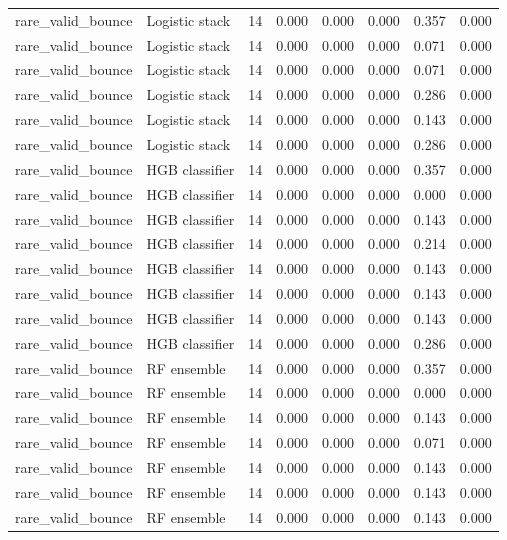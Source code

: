 {\begin{longtable}{llrrrrrr}
rare\_valid\_bounce & Logistic stack & 14 & 0.000 & 0.000 & 0.000 & 0.357 & 0.000 \\
rare\_valid\_bounce & Logistic stack & 14 & 0.000 & 0.000 & 0.000 & 0.071 & 0.000 \\
rare\_valid\_bounce & Logistic stack & 14 & 0.000 & 0.000 & 0.000 & 0.071 & 0.000 \\
rare\_valid\_bounce & Logistic stack & 14 & 0.000 & 0.000 & 0.000 & 0.286 & 0.000 \\
rare\_valid\_bounce & Logistic stack & 14 & 0.000 & 0.000 & 0.000 & 0.143 & 0.000 \\
rare\_valid\_bounce & Logistic stack & 14 & 0.000 & 0.000 & 0.000 & 0.286 & 0.000 \\
rare\_valid\_bounce & HGB classifier & 14 & 0.000 & 0.000 & 0.000 & 0.357 & 0.000 \\
rare\_valid\_bounce & HGB classifier & 14 & 0.000 & 0.000 & 0.000 & 0.000 & 0.000 \\
rare\_valid\_bounce & HGB classifier & 14 & 0.000 & 0.000 & 0.000 & 0.143 & 0.000 \\
rare\_valid\_bounce & HGB classifier & 14 & 0.000 & 0.000 & 0.000 & 0.214 & 0.000 \\
rare\_valid\_bounce & HGB classifier & 14 & 0.000 & 0.000 & 0.000 & 0.143 & 0.000 \\
rare\_valid\_bounce & HGB classifier & 14 & 0.000 & 0.000 & 0.000 & 0.143 & 0.000 \\
rare\_valid\_bounce & HGB classifier & 14 & 0.000 & 0.000 & 0.000 & 0.143 & 0.000 \\
rare\_valid\_bounce & HGB classifier & 14 & 0.000 & 0.000 & 0.000 & 0.286 & 0.000 \\
rare\_valid\_bounce & RF ensemble & 14 & 0.000 & 0.000 & 0.000 & 0.357 & 0.000 \\
rare\_valid\_bounce & RF ensemble & 14 & 0.000 & 0.000 & 0.000 & 0.000 & 0.000 \\
rare\_valid\_bounce & RF ensemble & 14 & 0.000 & 0.000 & 0.000 & 0.143 & 0.000 \\
rare\_valid\_bounce & RF ensemble & 14 & 0.000 & 0.000 & 0.000 & 0.071 & 0.000 \\
rare\_valid\_bounce & RF ensemble & 14 & 0.000 & 0.000 & 0.000 & 0.143 & 0.000 \\
rare\_valid\_bounce & RF ensemble & 14 & 0.000 & 0.000 & 0.000 & 0.143 & 0.000 \\
rare\_valid\_bounce & RF ensemble & 14 & 0.000 & 0.000 & 0.000 & 0.143 & 0.000 \\

\end{longtable}}
